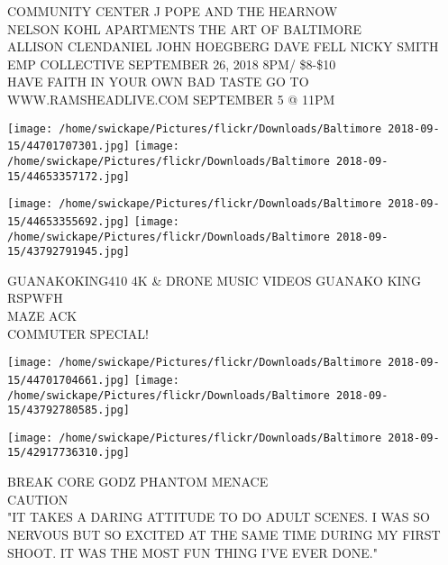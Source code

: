 \documentclass[10pt,letterpaper]{article}
\begin{document}
COMMUNITY CENTER J POPE AND THE HEARNOW\\
NELSON KOHL APARTMENTS THE ART OF BALTIMORE\\
ALLISON CLENDANIEL JOHN HOEGBERG DAVE FELL NICKY SMITH EMP COLLECTIVE SEPTEMBER 26, 2018 8PM/ \$8{-}\$10\\
HAVE FAITH IN YOUR OWN BAD TASTE GO TO WWW.RAMSHEADLIVE.COM SEPTEMBER 5 @ 11PM\\
\pagebreak

\texttt{[image: /home/swickape/Pictures/flickr/Downloads/Baltimore 2018-09-15/44701707301.jpg]}
\texttt{[image: /home/swickape/Pictures/flickr/Downloads/Baltimore 2018-09-15/44653357172.jpg]}

\texttt{[image: /home/swickape/Pictures/flickr/Downloads/Baltimore 2018-09-15/44653355692.jpg]}
\texttt{[image: /home/swickape/Pictures/flickr/Downloads/Baltimore 2018-09-15/43792791945.jpg]}

GUANAKOKING410 4K \& DRONE MUSIC VIDEOS GUANAKO KING\\
RSPWFH\\
MAZE ACK\\
COMMUTER SPECIAL!\\
\pagebreak

\texttt{[image: /home/swickape/Pictures/flickr/Downloads/Baltimore 2018-09-15/44701704661.jpg]}
\texttt{[image: /home/swickape/Pictures/flickr/Downloads/Baltimore 2018-09-15/43792780585.jpg]}

\texttt{[image: /home/swickape/Pictures/flickr/Downloads/Baltimore 2018-09-15/42917736310.jpg]}

BREAK CORE GODZ PHANTOM MENACE\\
CAUTION\\
"IT TAKES A DARING ATTITUDE TO DO ADULT SCENES.  I WAS SO NERVOUS BUT SO EXCITED AT THE SAME TIME DURING MY FIRST SHOOT.  IT WAS THE MOST FUN THING I'VE EVER DONE."\\
\pagebreak
\end{document}
